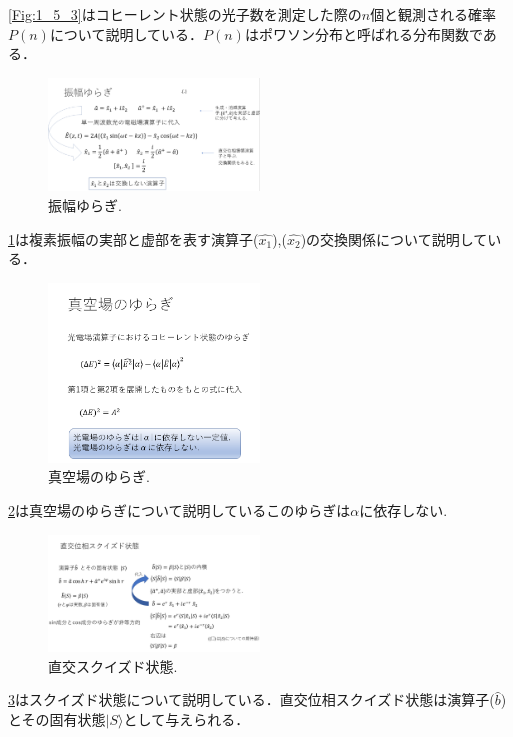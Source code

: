 \documentclass[a4j,twocolumn]{jarticle}
\def \figref #1{\figurename\ref{#1}}
\begin{document}
    \figref{Fig:1_5_3}はコヒーレント状態の光子数を測定した際の$n$個と観測される確率$P(n)$について説明している．$P(n)$はポワソン分布と呼ばれる分布関数である．

\begin{figure}[htbp]
        \centering   
        \includegraphics[width=0.5\textwidth]{img/zemi12.png}
        \caption[sample image (png)]{振幅ゆらぎ.}
        \label{Fig:1_5_4}
    \end{figure}

    \figref{Fig:1_5_4}は複素振幅の実部と虚部を表す演算子($\hat{x_1}$),($\hat{x_2}$)の交換関係について説明している．

\begin{figure}[htbp]
        \centering   
        \includegraphics[width=0.5\textwidth]{img/zemi13.png}
        \caption[sample image (png)]{真空場のゆらぎ.}
        \label{Fig:1_5_5}
    \end{figure}
    \figref{Fig:1_5_5}は真空場のゆらぎについて説明しているこのゆらぎは$α$に依存しない.
    
\begin{figure}[htbp]
        \centering   
        \includegraphics[width=0.5\textwidth]{img/zemi14.png}
        \caption[sample image (png)]{直交スクイズド状態.}
        \label{Fig:1_5_6}
    \end{figure}
    \figref{Fig:1_5_6}はスクイズド状態について説明している．直交位相スクイズド状態は演算子($\hat{b}$)とその固有状態$|{S}\rangle$として与えられる．
\end{document}
